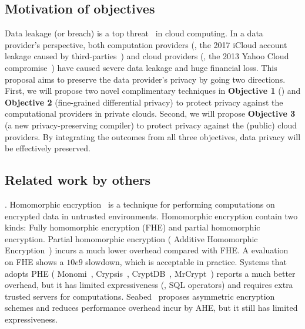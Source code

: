 \vspace{-.15in}\subsection{Motivation of objectives} 
\label{sec:motivation}\vspace{-.075in}


Data leakage (or breach) is a top threat~\cite{top-threats,kazim2015survey} in 
cloud computing. In a data provider's perspective, both computation providers 
(\eg, the 2017 iCloud account leakage caused 
by third-parties~\cite{icloud-breach}) and cloud providers (\eg, the 2013 Yahoo 
Cloud compromise~\cite{yahoo-dropbox-breach}) have caused severe data leakage 
and huge financial loss. This proposal aims to preserve the data provider's 
privacy by going two directions. First, we will propose two novel complimentary 
techniques in \textbf{Objective 1} (\kakute) and \textbf{Objective 2} 
(fine-grained differential privacy) to protect privacy against the computational 
providers in private clouds. Second, we will propose \textbf{Objective 3} (a 
new privacy-preserving compiler) to protect privacy against the (public) cloud 
providers. By integrating the outcomes from all three objectives, data privacy 
will be effectively preserved.


\subsection{Related work by others} 
\label{sec:others-work}\vspace{-.075in}

. Homomorphic 
encryption~\cite{fullmomo:stoc09,paillier,elgamal} is a
technique for performing computations on encrypted data in untrusted 
environments. Homomorphic encryption contain two kinds: Fully 
homomorphic encryption (FHE) and partial 
homomorphic encryption.
Partial homomorphic encryption (\eg{} Additive Homomorphic 
Encryption~\cite{paillier})
incurs a much lower overhead compared with FHE. A evaluation~\cite{homo:eval} on
FHE shows a $10e9$ slowdown, which is acceptable in practice.
Systems that adopts PHE (\eg{} Monomi~\cite{monomi:vldb13},
Crypsis~\cite{crypsis:hotcloud14}, CryptDB~\cite{cryptdb:sosp11},
MrCrypt~\cite{mrcrypt:oospsla14})
reports a much better overhead, but it has limited expressiveness
(\eg, SQL operators) and requires extra trusted servers for computations.
Seabed~\cite{seabed:osdi16} proposes asymmetric encryption schemes and reduces 
performance overhead incur by AHE, but it still has limited expressiveness.

